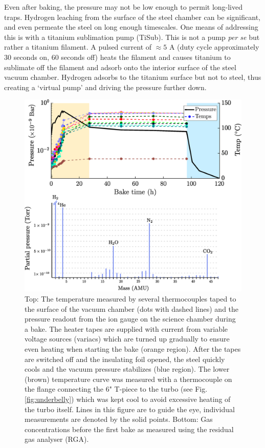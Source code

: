 		Even after baking, the pressure may not be low enough to permit long-lived traps.
		Hydrogen leaching from the surface of the steel chamber can be significant, and even permeate the steel on long enough timescales.
		One means of addressing this is with a titanium sublimation pump (TiSub).
		This is not a pump \emph{per se} but rather a titanium filament.
		A pulsed current of $\approx5$ A (duty cycle approximately 30 seconds on, 60 seconds off) heats the filament and causes titanium to sublimate off the filament and adsorb onto the interior surface of the steel vacuum chamber.
		Hydrogen adsorbs to the titanium surface but not to steel, thus creating a `virtual pump' and driving the pressure further down.


		\begin{figure}
		\includegraphics[width=\textwidth]{fig/lattice/RGA_pre_post_bake_nice}
		\caption{Top: The temperature measured by several thermocouples taped to the surface of the vacuum chamber (dots with dashed lines) and the pressure readout from the ion gauge on the science chamber during a bake.
		The heater tapes are supplied with current from variable voltage sources (variacs) which are turned up gradually to ensure even heating when starting the bake (orange region).
		After the tapes are switched off and the insulating foil opened, the steel quickly cools and the vacuum pressure stabilizes (blue region).
		The lower (brown) temperature curve was measured with a thermocouple on the flange connecting the 6" T-piece to the turbo (see Fig. \ref{fig:underbelly}) which was kept cool to avoid excessive heating of the turbo itself. 
		Lines in this figure are to guide the eye, individual measurements are denoted by the solid points.
		Bottom:
		Gas concentrations before the first bake as measured using the residual gas analyser (RGA).}
		\label{fig:bakeouts}
		\end{figure}

